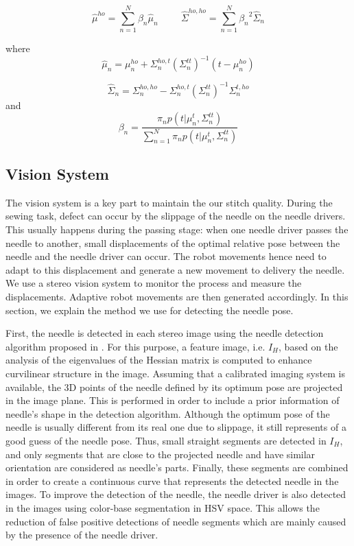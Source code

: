 \begin{equation}
{
\hat{\mu}^{ho} = \sum_{n=1}^N{\beta_n}\hat{\mu}_{n}
}
\hspace{1cm}
{
\hat{\Sigma}^{ho,ho} = \sum_{n=1}^N{\beta_n}^2\hat{\Sigma}_{n}
}
\end{equation}

where
\begin{equation}
{
\hat{\mu}_{n} = {\mu}_{n}^{ho} + \Sigma_{n}^{ho,t}({\Sigma}_{n}^{tt})^{-1}(t-{\mu}_{n}^{ho})
}
\end{equation}

\begin{equation}
{
\hat{\Sigma}_{n} = {\Sigma}_{n}^{ho,ho} - {\Sigma}_{n}^{ho,t}({\Sigma}_{n}^{tt})^{-1}{\Sigma}_{n}^{t,ho}
}
\end{equation}
and
\begin{equation}
{
\beta_n = \frac{\pi_{n}p(t|{\mu}_{n}^t,{\Sigma}_{n}^{tt})}
{\sum_{n=1}^N{\pi_n}p(t|{\mu}_{n}^t,{\Sigma}_{n}^{tt})}
}
\end{equation}

\subsection{Vision System}
The vision system is a key part to maintain the our stitch quality. During the sewing task, defect can occur by the slippage of the needle on the needle drivers. This usually happens during the passing stage: when one needle driver passes the needle to another, small displacements of the optimal relative pose between the needle and the needle driver can occur. The robot movements hence need to adapt to this displacement and generate a new movement to delivery the needle. We use a stereo vision system to monitor the process and measure the displacements. Adaptive robot movements are then generated accordingly. In this section, we explain the method we use for detecting the needle pose.

First, the needle is detected in each stereo image using the needle detection algorithm proposed in \cite{Rafii-Tari2015}. For this purpose, a feature image, i.e. $I_H$, based on the analysis of the eigenvalues of the Hessian matrix \cite{Walsum2005} is computed to enhance curvilinear structure in the image. Assuming that a calibrated imaging system is available, the 3D points of the needle defined by its optimum pose are projected in the image plane. This is performed in order to include a prior information of needle's shape in the detection algorithm. Although the optimum pose of the needle is usually different from its real one due to slippage, it still represents of a good guess of the needle pose. Thus, small straight segments are detected in $I_H$, and only segments that are close to the projected needle and have similar orientation are considered as needle's parts. Finally, these segments are combined in order to create a continuous curve that represents the detected needle in the images. To improve the detection of the needle, the needle driver is also detected in the images using color-base segmentation in HSV space. This allows the reduction of false positive detections of needle segments which are mainly caused by the presence of the needle driver.

